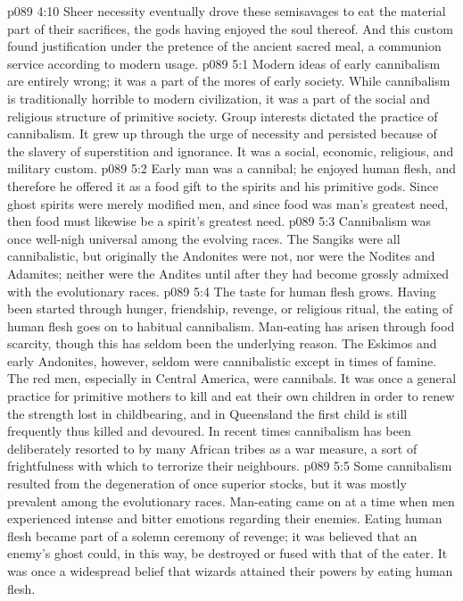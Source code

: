 \vs p089 4:10 Sheer necessity eventually drove these semisavages to eat the material part of their sacrifices, the gods having enjoyed the soul thereof. And this custom found justification under the pretence of the ancient sacred meal, a communion service according to modern usage.
\vs p089 5:1 Modern ideas of early cannibalism are entirely wrong; it was a part of the mores of early society. While cannibalism is traditionally horrible to modern civilization, it was a part of the social and religious structure of primitive society. Group interests dictated the practice of cannibalism. It grew up through the urge of necessity and persisted because of the slavery of superstition and ignorance. It was a social, economic, religious, and military custom.
\vs p089 5:2 Early man was a cannibal; he enjoyed human flesh, and therefore he offered it as a food gift to the spirits and his primitive gods. Since ghost spirits were merely modified men, and since food was man’s greatest need, then food must likewise be a spirit’s greatest need.
\vs p089 5:3 Cannibalism was once well\hyp{}nigh universal among the evolving races. The Sangiks were all cannibalistic, but originally the Andonites were not, nor were the Nodites and Adamites; neither were the Andites until after they had become grossly admixed with the evolutionary races.
\vs p089 5:4 The taste for human flesh grows. Having been started through hunger, friendship, revenge, or religious ritual, the eating of human flesh goes on to habitual cannibalism. Man\hyp{}eating has arisen through food scarcity, though this has seldom been the underlying reason. The Eskimos and early Andonites, however, seldom were cannibalistic except in times of famine. The red men, especially in Central America, were cannibals. It was once a general practice for primitive mothers to kill and eat their own children in order to renew the strength lost in childbearing, and in Queensland the first child is still frequently thus killed and devoured. In recent times cannibalism has been deliberately resorted to by many African tribes as a war measure, a sort of frightfulness with which to terrorize their neighbours.
\vs p089 5:5 Some cannibalism resulted from the degeneration of once superior stocks, but it was mostly prevalent among the evolutionary races. Man\hyp{}eating came on at a time when men experienced intense and bitter emotions regarding their enemies. Eating human flesh became part of a solemn ceremony of revenge; it was believed that an enemy’s ghost could, in this way, be destroyed or fused with that of the eater. It was once a widespread belief that wizards attained their powers by eating human flesh.
